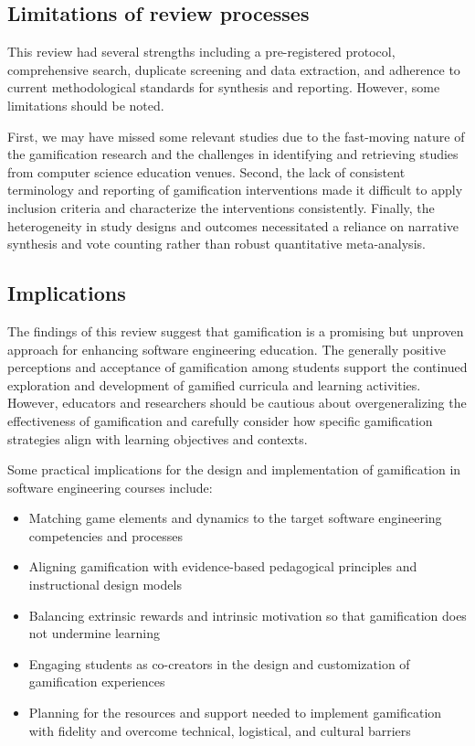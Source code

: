 \documentclass[
	hf,
	]{ceurart}
\begin{document}
		\subsection{Limitations of review processes}
		This review had several strengths including a pre-registered protocol, comprehensive search, duplicate screening and data extraction, and adherence to current methodological standards for synthesis and reporting. However, some limitations should be noted. 
		
		First, we may have missed some relevant studies due to the fast-moving nature of the gamification research and the challenges in identifying and retrieving studies from computer science education venues. Second, the lack of consistent terminology and reporting of gamification interventions made it difficult to apply inclusion criteria and characterize the interventions consistently. Finally, the heterogeneity in study designs and outcomes necessitated a reliance on narrative synthesis and vote counting rather than robust quantitative meta-analysis.
		
		\subsection{Implications}
		The findings of this review suggest that gamification is a promising but unproven approach for enhancing software engineering education. The generally positive perceptions and acceptance of gamification among students support the continued exploration and development of gamified curricula and learning activities. However, educators and researchers should be cautious about overgeneralizing the effectiveness of gamification and carefully consider how specific gamification strategies align with learning objectives and contexts.
		
		Some practical implications for the design and implementation of gamification in software engineering courses include:
		
		\begin{itemize}
			\item 
		Matching game elements and dynamics to the target software engineering competencies and processes
				\item 
		Aligning gamification with evidence-based pedagogical principles and instructional design models 
				\item 
		Balancing extrinsic rewards and intrinsic motivation so that gamification does not undermine learning
				\item 
		Engaging students as co-creators in the design and customization of gamification experiences
				\item 
		Planning for the resources and support needed to implement gamification with fidelity and overcome technical, logistical, and cultural barriers
		\end{itemize}
		
\end{document}

